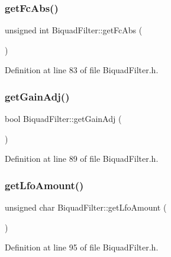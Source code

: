 \subsubsection{\texorpdfstring{get\+Fc\+Abs()}{getFcAbs()}}
{\footnotesize\ttfamily unsigned int Biquad\+Filter\+::get\+Fc\+Abs (\begin{DoxyParamCaption}{ }\end{DoxyParamCaption})\hspace{0.3cm}{\ttfamily [inline]}}



Definition at line 83 of file Biquad\+Filter.\+h.

\mbox{\label{class_biquad_filter_a6273d6f759d29500443dd9991125e763}} 
\subsubsection{\texorpdfstring{get\+Gain\+Adj()}{getGainAdj()}}
{\footnotesize\ttfamily bool Biquad\+Filter\+::get\+Gain\+Adj (\begin{DoxyParamCaption}{ }\end{DoxyParamCaption})\hspace{0.3cm}{\ttfamily [inline]}}



Definition at line 89 of file Biquad\+Filter.\+h.

\mbox{\label{class_biquad_filter_aa6cee8e0caed47a12edb5f58b40b0561}} 
\subsubsection{\texorpdfstring{get\+Lfo\+Amount()}{getLfoAmount()}}
{\footnotesize\ttfamily unsigned char Biquad\+Filter\+::get\+Lfo\+Amount (\begin{DoxyParamCaption}{ }\end{DoxyParamCaption})\hspace{0.3cm}{\ttfamily [inline]}}



Definition at line 95 of file Biquad\+Filter.\+h.

